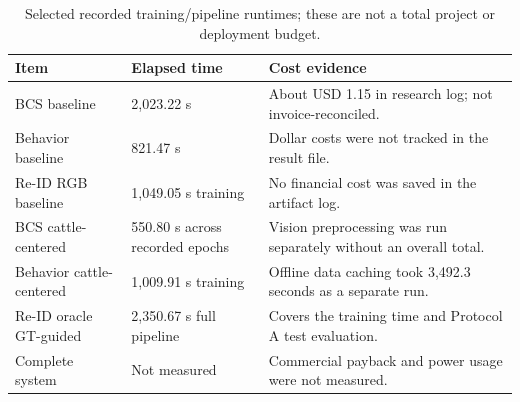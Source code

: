 \begin{table}[htbp]
\centering\small
\caption[Recorded runtime and partial costs]{Selected recorded training/pipeline runtimes; these are not a total project or deployment budget.}\label{tab:costs}
\begin{tabularx}{\textwidth}{lYY}
\toprule
Item & Elapsed time & Cost evidence \\
\midrule
BCS baseline & 2,023.22 s & About USD 1.15 in research log; not invoice-reconciled. \\
Behavior baseline & 821.47 s & Dollar costs were not tracked in the result file. \\
Re-ID RGB baseline & 1,049.05 s training & No financial cost was saved in the artifact log. \\
BCS cattle-centered & 550.80 s across recorded epochs & Vision preprocessing was run separately without an overall total. \\
Behavior cattle-centered & 1,009.91 s training & Offline data caching took 3,492.3 seconds as a separate run. \\
Re-ID oracle GT-guided & 2,350.67 s full pipeline & Covers the training time and Protocol A test evaluation. \\
Complete system & Not measured & Commercial payback and power usage were not measured. \\
\bottomrule
\end{tabularx}
\end{table}

